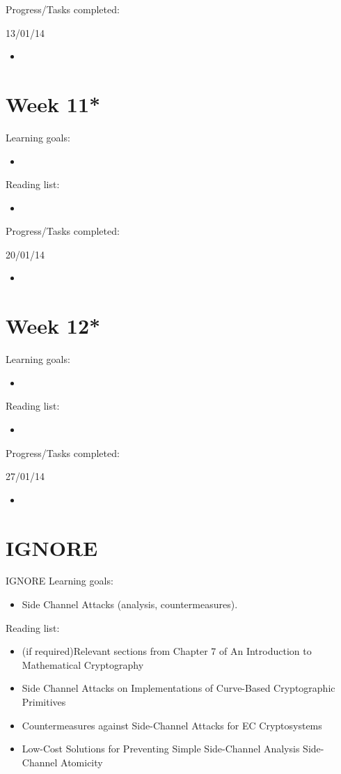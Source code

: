 \documentclass[a4paper, 10pt, envcountsect, runningheads]{article}
\begin{document}
Progress/Tasks completed:

13/01/14
\begin{itemize}
\item 
\end{itemize}



\newpage
\section*{Week 11*}
Learning goals:
\begin{itemize}
\item 
\end{itemize}

Reading list:
\begin{itemize}
\item 
\end{itemize}

Progress/Tasks completed:

20/01/14
\begin{itemize}
\item 
\end{itemize}



\newpage
\section*{Week 12*}
Learning goals:
\begin{itemize}
\item 
\end{itemize}

Reading list:
\begin{itemize}
\item 
\end{itemize}

Progress/Tasks completed:

27/01/14
\begin{itemize}
\item 
\end{itemize}



\section*{IGNORE}
IGNORE
Learning goals:
\begin{itemize}
\item Side Channel Attacks (analysis, countermeasures).
\end{itemize}
Reading list:
\begin{itemize}
\item (if required)Relevant sections from Chapter 7 of An Introduction to Mathematical Cryptography
\item Side Channel Attacks on Implementations of Curve-Based Cryptographic Primitives 
\item Countermeasures against Side-Channel Attacks for EC Cryptosystems
\item Low-Cost Solutions for Preventing Simple Side-Channel Analysis Side-Channel Atomicity
\end{itemize}
\end{document}
